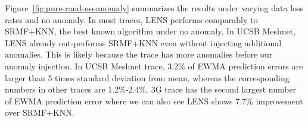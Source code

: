 
Figure~\ref{fig:pure-rand-no-anomaly} summarizes the results under
varying data loss rates and no anomaly. In most traces, LENS performs
comparably to SRMF+KNN, the best known algorithm under no anomaly.
In UCSB Meshnet, LENS already out-performs SRMF+KNN even
without injecting additional anomalies. This is likely because the
trace has more anomalies before our anomaly injection. In UCSB Meshnet trace,
3.2\% of EWMA prediction errors are larger than 5 times standard deviation 
from mean, whereas the corresponding numbers in other traces are
1.2\%-2.4\%. 3G trace has the second largest number of EWMA prediction error 
where we can also see LENS shows 7.7\% improvement over SRMF+KNN.






